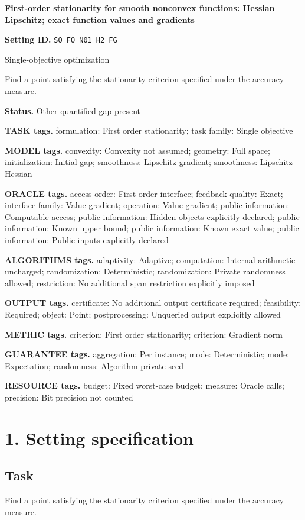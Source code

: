 \documentclass[10pt,a4paper]{article}
\begin{document}
\raggedright

{\LARGE\bfseries\sffamily\color{AtlasNavy} First-order stationarity for smooth nonconvex functions: Hessian Lipschitz; exact function values and gradients\par}\vspace{5pt}
\textbf{Setting ID.} \texttt{SO\_\allowbreak{}FO\_\allowbreak{}N01\_\allowbreak{}H2\_\allowbreak{}FG}

Single-objective optimization

Find a point satisfying the stationarity criterion specified under the accuracy measure.

\textbf{Status.} Other quantified gap present

\textbf{TASK tags.} formulation: First order stationarity; task family: Single objective

\textbf{MODEL tags.} convexity: Convexity not assumed; geometry: Full space; initialization: Initial gap; smoothness: Lipschitz gradient; smoothness: Lipschitz Hessian

\textbf{ORACLE tags.} access order: First-order interface; feedback quality: Exact; interface family: Value gradient; operation: Value gradient; public information: Computable access; public information: Hidden objects explicitly declared; public information: Known upper bound; public information: Known exact value; public information: Public inputs explicitly declared

\textbf{ALGORITHMS tags.} adaptivity: Adaptive; computation: Internal arithmetic uncharged; randomization: Deterministic; randomization: Private randomness allowed; restriction: No additional span restriction explicitly imposed

\textbf{OUTPUT tags.} certificate: No additional output certificate required; feasibility: Required; object: Point; postprocessing: Unqueried output explicitly allowed

\textbf{METRIC tags.} criterion: First order stationarity; criterion: Gradient norm

\textbf{GUARANTEE tags.} aggregation: Per instance; mode: Deterministic; mode: Expectation; randomness: Algorithm private seed

\textbf{RESOURCE tags.} budget: Fixed worst-case budget; measure: Oracle calls; precision: Bit precision not counted

\section{1. Setting specification}
\subsection{Task}
Find a point satisfying the stationarity criterion specified under the accuracy measure.
\end{document}
